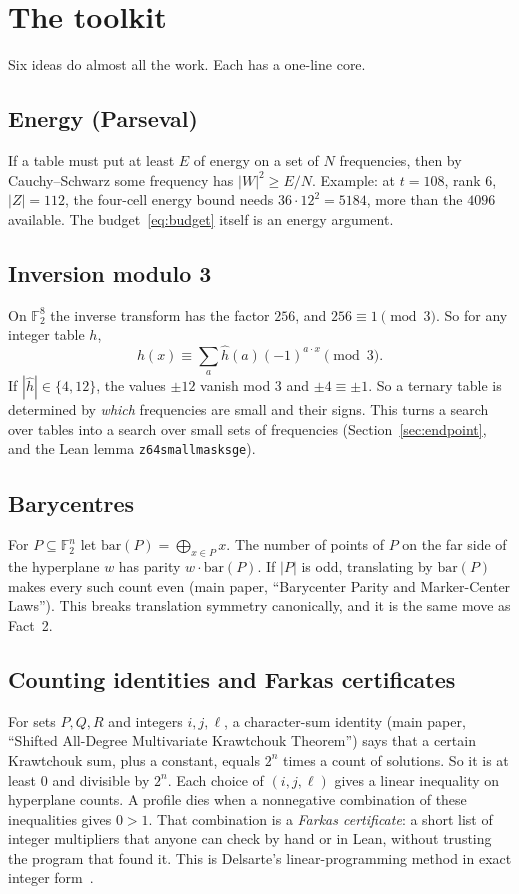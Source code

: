 \documentclass[11pt]{article}
\theoremstyle{definition}
\theoremstyle{remark}
\newcommand{\F}{\mathbb{F}}
\newcommand{\code}[1]{\texttt{#1}}
\DeclareRobustCommand{\_}{\textunderscore\allowbreak}
\begin{document}
\section{The toolkit}
\label{sec:toolkit}

Six ideas do almost all the work. Each has a one-line core.

\subsection{Energy (Parseval)}
If a table must put at least $E$ of energy on a set of $N$ frequencies, then by Cauchy--Schwarz some frequency has $|W|^2\ge E/N$. Example: at $t=108$, rank $6$, $|Z|=112$, the four-cell energy bound needs $36\cdot12^2=5184$, more than the $4096$ available. The budget~\eqref{eq:budget} itself is an energy argument.

\subsection{Inversion modulo 3}
On $\F_2^8$ the inverse transform has the factor $256$, and $256\equiv1\pmod3$. So for any integer table $h$,
\[
  h(x)\equiv\sum_a\widehat h(a)(-1)^{a\cdot x}\pmod 3 .
\]
If $|\widehat h|\in\{4,12\}$, the values $\pm12$ vanish mod $3$ and $\pm4\equiv\pm1$. So a ternary table is determined by \emph{which} frequencies are small and their signs. This turns a search over tables into a search over small sets of frequencies (Section~\ref{sec:endpoint}, and the Lean lemma \code{z64\_small\_masks\_ge\_9}).

\subsection{Barycentres}
For $P\subseteq\F_2^n$ let $\mathrm{bar}(P)=\bigoplus_{x\in P}x$. The number of points of $P$ on the far side of the hyperplane $w$ has parity $w\cdot\mathrm{bar}(P)$. If $|P|$ is odd, translating by $\mathrm{bar}(P)$ makes every such count even (main paper, ``Barycenter Parity and Marker-Center Laws''). This breaks translation symmetry canonically, and it is the same move as Fact~2.

\subsection{Counting identities and Farkas certificates}
For sets $P,Q,R$ and integers $i,j,\ell$, a character-sum identity (main paper, ``Shifted All-Degree Multivariate Krawtchouk Theorem'') says that a certain Krawtchouk sum, plus a constant, equals $2^n$ times a count of solutions. So it is at least $0$ and divisible by $2^n$. Each choice of $(i,j,\ell)$ gives a linear inequality on hyperplane counts. A profile dies when a nonnegative combination of these inequalities gives $0>1$. That combination is a \emph{Farkas certificate}: a short list of integer multipliers that anyone can check by hand or in Lean, without trusting the program that found it. This is Delsarte's linear-programming method in exact integer form~\cite{Delsarte1973}.
\end{document}
